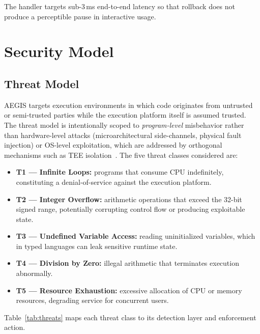 \documentclass[conference]{IEEEtran}
\begin{document}
The handler targets sub-3\,ms end-to-end latency so that rollback
does not produce a perceptible pause in interactive usage.

\section{Security Model}
\label{sec:security}

\subsection{Threat Model}

AEGIS targets execution environments in which code originates from
untrusted or semi-trusted parties while the execution platform
itself is assumed trusted. The threat model is intentionally
scoped to \emph{program-level} misbehavior rather than
hardware-level attacks (microarchitectural side-channels, physical
fault injection) or OS-level exploitation, which are addressed by
orthogonal mechanisms such as TEE isolation~\cite{menetrey2024sgx}.
The five threat classes considered are:

\begin{itemize}
  \setlength\itemsep{1pt}
  \item \textbf{T1 — Infinite Loops:} programs that consume CPU
        indefinitely, constituting a denial-of-service against
        the execution platform.
  \item \textbf{T2 — Integer Overflow:} arithmetic operations that
        exceed the 32-bit signed range, potentially corrupting
        control flow or producing exploitable state.
  \item \textbf{T3 — Undefined Variable Access:} reading
        uninitialized variables, which in typed languages can
        leak sensitive runtime state.
  \item \textbf{T4 — Division by Zero:} illegal arithmetic that
        terminates execution abnormally.
  \item \textbf{T5 — Resource Exhaustion:} excessive allocation of
        CPU or memory resources, degrading service for concurrent
        users.
\end{itemize}

Table~\ref{tab:threats} maps each threat class to its detection
layer and enforcement action.
\end{document}
